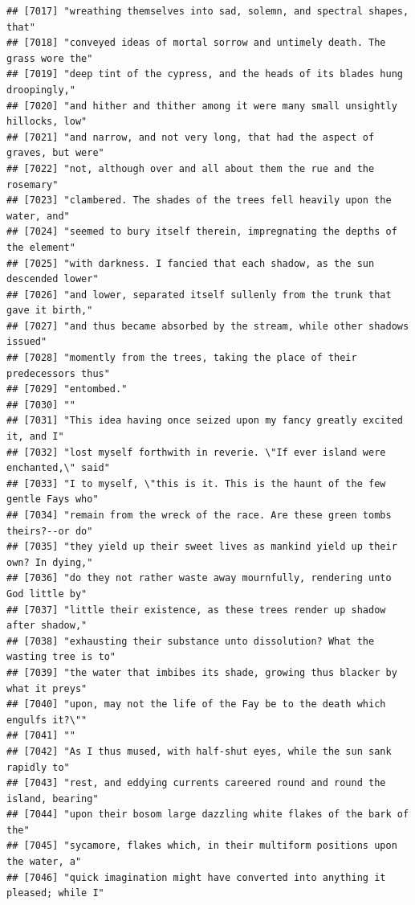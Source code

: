 \documentclass{article}\usepackage[]{graphicx}\usepackage[]{color}
\makeatletter
\newenvironment{kframe}{%
 \def\at@end@of@kframe{}%
 \ifinner\ifhmode%
  \def\at@end@of@kframe{\end{minipage}}%
  \begin{minipage}{\columnwidth}%
 \fi\fi%
 \def\FrameCommand##1{\hskip\@totalleftmargin \hskip-\fboxsep
 \colorbox{shadecolor}{##1}\hskip-\fboxsep
     \hskip-\linewidth \hskip-\@totalleftmargin \hskip\columnwidth}%
 \MakeFramed {\advance\hsize-\width
   \@totalleftmargin\z@ \linewidth\hsize
   \@setminipage}}%
 {\par\unskip\endMakeFramed%
 \at@end@of@kframe}
\newenvironment{knitrout}{}{} %
\makeatother
\begin{document}
\begin{knitrout}
\begin{kframe}
\begin{verbatim}
## [7017] "wreathing themselves into sad, solemn, and spectral shapes, that"            
## [7018] "conveyed ideas of mortal sorrow and untimely death. The grass wore the"      
## [7019] "deep tint of the cypress, and the heads of its blades hung droopingly,"      
## [7020] "and hither and thither among it were many small unsightly hillocks, low"     
## [7021] "and narrow, and not very long, that had the aspect of graves, but were"      
## [7022] "not, although over and all about them the rue and the rosemary"              
## [7023] "clambered. The shades of the trees fell heavily upon the water, and"         
## [7024] "seemed to bury itself therein, impregnating the depths of the element"       
## [7025] "with darkness. I fancied that each shadow, as the sun descended lower"       
## [7026] "and lower, separated itself sullenly from the trunk that gave it birth,"     
## [7027] "and thus became absorbed by the stream, while other shadows issued"          
## [7028] "momently from the trees, taking the place of their predecessors thus"        
## [7029] "entombed."                                                                   
## [7030] ""                                                                            
## [7031] "This idea having once seized upon my fancy greatly excited it, and I"        
## [7032] "lost myself forthwith in reverie. \"If ever island were enchanted,\" said"   
## [7033] "I to myself, \"this is it. This is the haunt of the few gentle Fays who"     
## [7034] "remain from the wreck of the race. Are these green tombs theirs?--or do"     
## [7035] "they yield up their sweet lives as mankind yield up their own? In dying,"    
## [7036] "do they not rather waste away mournfully, rendering unto God little by"      
## [7037] "little their existence, as these trees render up shadow after shadow,"       
## [7038] "exhausting their substance unto dissolution? What the wasting tree is to"    
## [7039] "the water that imbibes its shade, growing thus blacker by what it preys"     
## [7040] "upon, may not the life of the Fay be to the death which engulfs it?\""       
## [7041] ""                                                                            
## [7042] "As I thus mused, with half-shut eyes, while the sun sank rapidly to"         
## [7043] "rest, and eddying currents careered round and round the island, bearing"     
## [7044] "upon their bosom large dazzling white flakes of the bark of the"             
## [7045] "sycamore, flakes which, in their multiform positions upon the water, a"      
## [7046] "quick imagination might have converted into anything it pleased; while I"    

\end{verbatim}
\end{kframe}
\end{knitrout}
\end{document}
